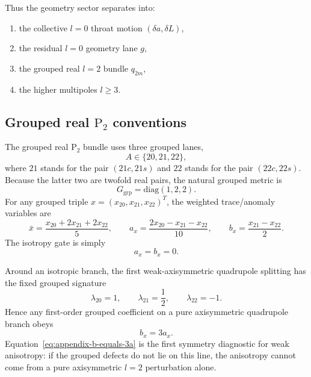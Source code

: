 \documentclass[11pt]{article}
\theoremstyle{definition}
\newcommand{\Ptwo}{\ensuremath{\mathrm{P}_2}}
\newcommand{\diag}{\mathrm{diag}}
\begin{document}
Thus the geometry sector separates into:
\begin{enumerate}
    \item the collective $l=0$ throat motion $(\delta a,\delta L)$,
    \item the residual $l=0$ geometry lane $g$,
    \item the grouped real $l=2$ bundle $q_{2m}$,
    \item the higher multipoles $l\geq 3$.
\end{enumerate}

\subsection{Grouped real \texorpdfstring{$\Ptwo$}{P2} conventions}

The grouped real $\Ptwo$ bundle uses three grouped lanes,
\[
A\in\{20,21,22\},
\]
where $21$ stands for the pair $(21c,21s)$ and $22$ stands for the pair $(22c,22s)$. Because the latter two are twofold real pairs, the natural grouped metric is
\begin{equation}
G_{\mathrm{grp}}=\diag(1,2,2).
\label{eq:appendix-grouped-metric}
\end{equation}
For any grouped triple $x=(x_{20},x_{21},x_{22})^T$, the weighted trace/anomaly variables are
\begin{equation}
\bar x=\frac{x_{20}+2x_{21}+2x_{22}}{5},
\qquad
 a_x=\frac{2x_{20}-x_{21}-x_{22}}{10},
\qquad
 b_x=\frac{x_{21}-x_{22}}{2}.
\label{eq:appendix-grouped-trace-anomaly}
\end{equation}
The isotropy gate is simply
\begin{equation}
a_x=b_x=0.
\label{eq:appendix-isotropy-gate}
\end{equation}

Around an isotropic branch, the first weak-axisymmetric quadrupole splitting has the fixed grouped signature
\begin{equation}
\lambda_{20}=1,
\qquad
\lambda_{21}=\frac12,
\qquad
\lambda_{22}=-1.
\label{eq:appendix-weakax-signature}
\end{equation}
Hence any first-order grouped coefficient on a pure axisymmetric quadrupole branch obeys
\begin{equation}
b_x=3a_x.
\label{eq:appendix-b-equals-3a}
\end{equation}
Equation~\eqref{eq:appendix-b-equals-3a} is the first symmetry diagnostic for weak anisotropy: if the grouped defects do not lie on this line, the anisotropy cannot come from a pure axisymmetric $l=2$ perturbation alone.
\end{document}

